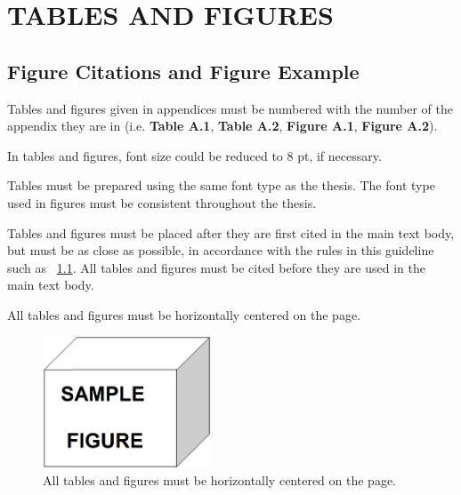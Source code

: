 \chapter{TABLES AND FIGURES}\label{CH2}

\vspace{6pt}

\section{Figure Citations and Figure Example}

Tables and figures given in appendices must be numbered with the number of the appendix they are in (i.e. \textbf{Table A.1}, \textbf{Table A.2}, \textbf{Figure A.1}, \textbf{Figure A.2}).

In tables and figures, font size could be reduced to 8 pt, if necessary.

Tables must be prepared using the same font type as the thesis. The font type used in figures must be consistent throughout the thesis.

Tables and figures must be placed after they are first cited in the main text body, but must be as close as possible, in accordance with the rules in this guideline such as \figurename\ \ref{fig:ch2-1}. All tables and figures must be cited before they are used in the main text body.

All tables and figures must be horizontally centered on the page.

\vspace{6pt} %
\begin{figure}[!ht]
    \centering
    \includegraphics[width=5cm,keepaspectratio=true]{./fig/sekil1.png}
    \caption{All tables and figures must be horizontally centered on the page.}
    \label{fig:ch2-1}
\end{figure}
\vspace{-6pt}

